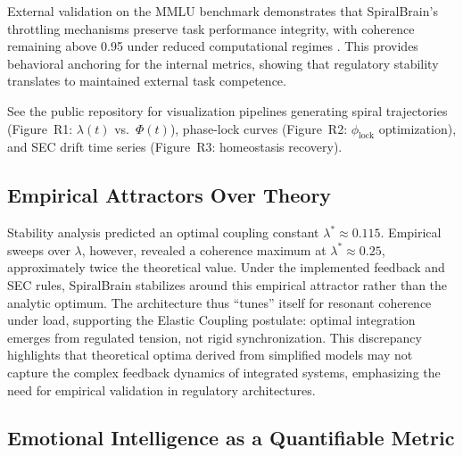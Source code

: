 \documentclass[11pt,a4paper]{article}
\begin{document}
External validation on the MMLU benchmark demonstrates that SpiralBrain's throttling mechanisms preserve task performance integrity, with coherence remaining above 0.95 under reduced computational regimes \cite{mmlu_cognitive_integrity}. This provides behavioral anchoring for the internal metrics, showing that regulatory stability translates to maintained external task competence.

See the public repository for visualization pipelines generating spiral trajectories (Figure~R1: $\lambda(t)$ vs.~$\Phi(t)$), phase-lock curves (Figure~R2: $\phi_\text{lock}$ optimization), and SEC drift time series (Figure~R3: homeostasis recovery).

\subsection{Empirical Attractors Over Theory}

Stability analysis predicted an optimal coupling constant \( \lambda^{*} \approx 0.115 \). Empirical sweeps over \( \lambda \), however, revealed a coherence maximum at \( \lambda^{*} \approx 0.25 \), approximately twice the theoretical value. Under the implemented feedback and SEC rules, SpiralBrain stabilizes around this empirical attractor rather than the analytic optimum. The architecture thus ``tunes'' itself for resonant coherence under load, supporting the Elastic Coupling postulate: optimal integration emerges from regulated tension, not rigid synchronization. This discrepancy highlights that theoretical optima derived from simplified models may not capture the complex feedback dynamics of integrated systems, emphasizing the need for empirical validation in regulatory architectures.

\subsection{Emotional Intelligence as a Quantifiable Metric}
\end{document}
